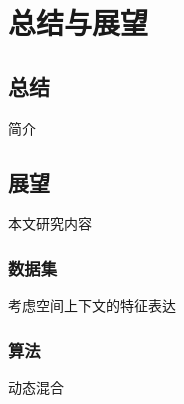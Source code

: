 \chapter{总结与展望}

\section{总结}
简介
\section{展望}
本文研究内容
\subsection{数据集}
考虑空间上下文的特征表达
\subsection{算法}
动态混合

